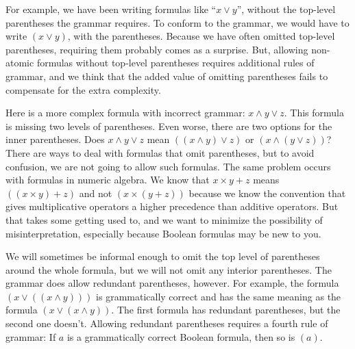 For example, we have been writing formulas like ``$x \vee y$'',
without the top-level parentheses
the grammar requires.
To conform to the grammar,
we would have to write $(x \vee y)$, with the parentheses.
Because we have often omitted top-level parentheses,
requiring them probably comes as a surprise.
But, allowing non-atomic formulas without top-level parentheses
requires additional rules of grammar,
and we think that the added value of omitting parentheses
fails to compensate for the extra complexity.

Here is a more complex formula with incorrect grammar:
$x \wedge y \vee z$. This formula is missing two levels of parentheses.
Even worse, there are two options for the inner parentheses.
Does $x \wedge y \vee z$ mean $((x \wedge y) \vee z)$ or $(x \wedge (y \vee z))$?
There are ways to deal with formulas that omit parentheses,
but to avoid confusion, we are not going to allow such formulas.
The same problem occurs with formulas in numeric algebra.
We know that $x \times y + z$ means $((x \times y) + z)$ and
not $(x \times (y + z))$ because we know the convention that
gives multiplicative operators a higher precedence than additive operators.
But that takes some getting used to, and we want to
minimize the possibility of misinterpretation,
especially because Boolean formulas may be new to you.

We will sometimes be informal enough to omit
the top level of parentheses around the whole formula,
but we will not omit any interior parentheses.
The grammar does allow redundant parentheses, however.
For example, the formula $(x \vee ((x \wedge y)))$
is grammatically correct and has the same meaning as the formula
$(x \vee (x \wedge y))$.
The first formula has redundant parentheses,
but the second one doesn't.
Allowing redundant parentheses requires a fourth rule of grammar:
If $a$ is a grammatically correct Boolean formula, then so is $(a)$.

